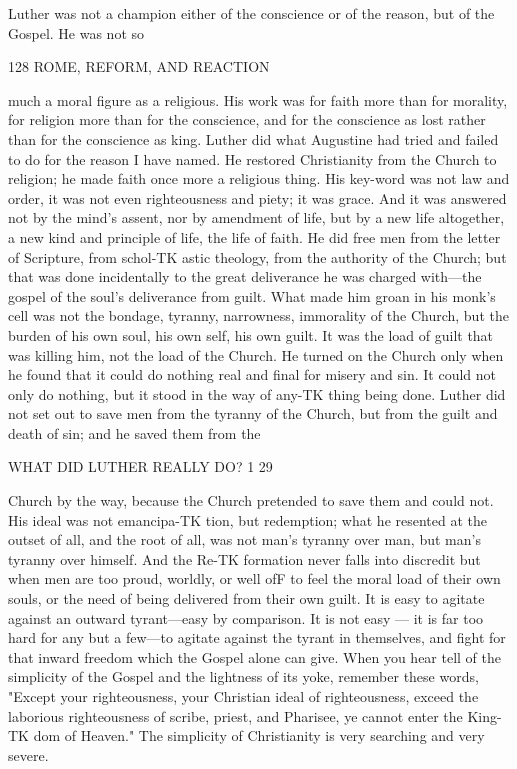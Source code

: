 \documentclass[12pt,a5paper,twoside]{book}
\begin{document}
Luther was not a champion either of the conscience 
or of the reason, but of the Gospel. He was not so 



128 ROME, REFORM, AND REACTION 

much a moral figure as a religious. His work was for 
faith more than for morality, for religion more than 
for the conscience, and for the conscience as lost 
rather than for the conscience as king. Luther did 
what Augustine had tried and failed to do for the 
reason I have named. He restored Christianity from 
the Church to religion; he made faith once more a 
religious thing. His key-word was not law and order, 
it was not even righteousness and piety; it was grace. 
And it was answered not by the mind's assent, nor by 
amendment of life, but by a new life altogether, a 
new kind and principle of life, the life of faith. He 
did free men from the letter of Scripture, from schol-TK
astic theology, from the authority of the Church; but 
that was done incidentally to the great deliverance he 
was charged with---the gospel of the soul's deliverance 
from guilt. What made him groan in his monk's cell 
was not the bondage, tyranny, narrowness, immorality 
of the Church, but the burden of his own soul, his 
own self, his own guilt. It was the load of guilt that 
was killing him, not the load of the Church. He 
turned on the Church only when he found that it could 
do nothing real and final for misery and sin. It could 
not only do nothing, but it stood in the way of any-TK
thing being done. Luther did not set out to save men 
from the tyranny of the Church, but from the guilt 
and death of sin; and he saved them from the 



WHAT DID LUTHER REALLY DO? 1 29 

Church by the way, because the Church pretended to 
save them and could not. His ideal was not emancipa-TK
tion, but redemption; what he resented at the outset 
of all, and the root of all, was not man's tyranny over 
man, but man's tyranny over himself. And the Re-TK
formation never falls into discredit but when men are 
too proud, worldly, or well ofF to feel the moral load 
of their own souls, or the need of being delivered 
from their own guilt. It is easy to agitate against an 
outward tyrant---easy by comparison. It is not easy 
— it is far too hard for any but a few---to agitate 
against the tyrant in themselves, and fight for that 
inward freedom which the Gospel alone can give. 
When you hear tell of the simplicity of the Gospel 
and the lightness of its yoke, remember these words, 
"Except your righteousness, your Christian ideal of 
righteousness, exceed the laborious righteousness of 
scribe, priest, and Pharisee, ye cannot enter the King-TK
dom of Heaven." The simplicity of Christianity is 
very searching and very severe. 
\end{document}
